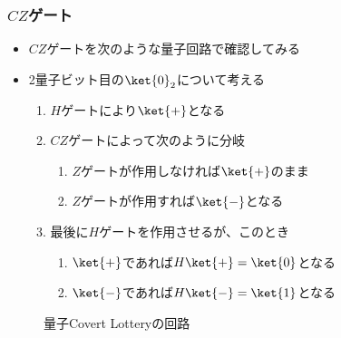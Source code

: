 \begin{frame}
  \frametitle{$CZ$ゲート}

  \begin{itemize}
    \item $CZ$ゲートを次のような量子回路で確認してみる
    \begin{figure}
      \centering
    \end{figure}
    
    \item 2量子ビット目の$\ket{0}_2$について考える
    \begin{enumerate}
      \item $H$ゲートにより$\ket{+}$となる

      \item $CZ$ゲートによって次のように分岐
      \begin{enumerate}
        \item $Z$ゲートが作用しなければ$\ket{+}$のまま
        \item $Z$ゲートが作用すれば$\ket{-}$となる
      \end{enumerate}

      \item 最後に$H$ゲートを作用させるが、このとき
      \begin{enumerate}
        \item $\ket{+}$であれば$H\ket{+} = \ket{0}$となる
        \item $\ket{-}$であれば$H\ket{-} = \ket{1}$となる
      \end{enumerate}
    \end{enumerate}
  \end{itemize}
\end{frame}

\begin{frame}
  \begin{figure}
    \centering
    \caption{量子Covert Lotteryの回路}
  \end{figure}
\end{frame}

